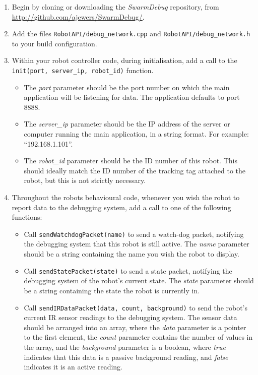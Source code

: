 \begin{enumerate}
 \item Begin by cloning or downloading the \textit{SwarmDebug} repository, from \url{http://github.com/ajewers/SwarmDebug/}.
 \item Add the files \texttt{RobotAPI/debug\_network.cpp} and \texttt{RobotAPI/debug\_network.h} to your build configuration.
 \item Within your robot controller code, during initialisation, add a call to the \texttt{init(port, server\_ip, robot\_id)} function.
 \begin{itemize}
  \item The \textit{port} parameter should be the port number on which the main application will be listening for data. The application defaults to port 8888.
  \item The \textit{server\_ip} parameter should be the IP address of the server or computer running the main application, in a string format. For example: ``192.168.1.101''.
  \item The \textit{robot\_id} parameter should be the ID number of this robot. This should ideally match the ID number of the tracking tag attached to the robot, but this is not strictly necessary.
 \end{itemize}
 \item Throughout the robots behavioural code, whenever you wish the robot to report data to the debugging system, add a call to one of the following functions:
 \begin{itemize}
  \item Call \texttt{sendWatchdogPacket(name)} to send a watch-dog packet, notifying the debugging system that this robot is still active. The \textit{name} parameter should be a string containing the name you wish the robot to display.
  \item Call \texttt{sendStatePacket(state)} to send a state packet, notifying the debugging system of the robot's current state. The \textit{state} parameter should be a string containing the state the robot is currently in.
  \item Call \texttt{sendIRDataPacket(data, count, background)} to send the robot's current IR sensor readings to the debugging system. The sensor data should be arranged into an array, where the \textit{data} parameter is a pointer to the first element, the \textit{count} parameter contains the number of values in the array, and the \textit{background} parameter is a boolean, where \textit{true} indicates that this data is a passive background reading, and \textit{false} indicates it is an active reading.

\end{itemize}
\end{enumerate}
